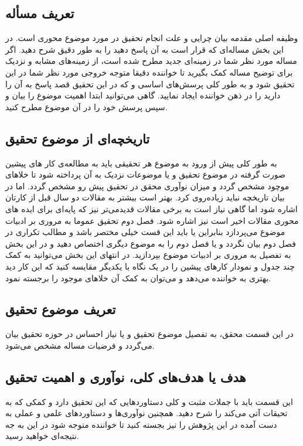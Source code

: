 \subsection{تعریف مسأله }
وظیفه اصلی مقدمه بیان چرایی و علت انجام تحقیق در مورد موضوع محوری \پ است. در این بخش مساله‌ای که قرار است به آن پاسخ دهید را به طور دقیق شرح دهید. اگر مساله مورد نظر شما در زمینه‌ای جدید مطرح شده است، از زمینه‌های مشابه و نزدیک برای توضیح مساله کمک بگیرید تا خواننده دقیقا متوجه خروجی مورد نظر شما در این تحقیق شود و به طور کلی پرسش‌های اساسی و که در این تحقیق قصد پاسخ به آن را دارید را در ذهن خواننده ایجاد نمایید. گاهی می‌توانید ابتدا اهمیت موضوع را بیان و سپس پرسش خود را در آن موضوع مطرح کنید.

\subsection{تاریخچه‌ای از موضوع تحقیق}
به طور کلی پیش از ورود به موضوع هر تحقیقی باید به مطالعه‌ی کار های پیشین صورت گرفته در موضوع تحقیق و یا موضوعات نزدیک به آن پرداخته شود تا خلاهای موچود مشخص گردد و میزان نوآوری محقق در تحقیق پیش رو مشخص گردد. اما در بیان تاریخچه نباید زیاده‌روی کرد. بهتر است بیشتر به مقالات دو سال قبل از کارتان اشاره شود اما گاهی نیاز است به برخی مقالات قدیدمی‌تر نیز که پایه‌ای برای ایده های محوری مقالات اخیر است نیز اشاره‌ شود. فصل دوم تحقیق عموما به مروری بر ادبیات موضوع می‌پردازد بنابراین یا باید این قست خیلی مختصر باشد و مطالب تکراری در فصل دوم بیان نگردد و یا فصل دوم را به موضوع دیگری اختصاص دهید و در این بخش به تفصیل به مروری بر ادبیات موضوع بپردازید. در انتهای این بخش می‌توانید به کمک چند جدول و نمودار کارهای پیشین را در یک نگاه با یکدیگر مقایسه کنید که این کار دید بهتری به خواننده می‌دهد و می‌توان به کمک آن خلاهای موجود را برجسته نمود.

\subsection{تعریف موضوع تحقیق}
در این قسمت محقق، به  تفصیل موضوع تحقیق و یا نیاز احساس در حوزه تحقیق بیان می‌گردد و فرضیات مساله  مشخص می‌شود.

\subsection{هدف یا هدف‌های کلی، نوآوری و اهمیت  تحقیق}
این قسمت باید با جملات مثبت و کلی دستاورد‌هایی که این تحقیق دارد و کمکی که به تحیقات آتی می‌کند را شرح دهید. همچنین نوآوری‌ها و دستاوردهای علمی و عملی به دست آمده در این پژوهش را نیز بجسته کنید تا خواننده متوجه شود در این \پ به جه نتیجه‌ای خواهید رسید.

